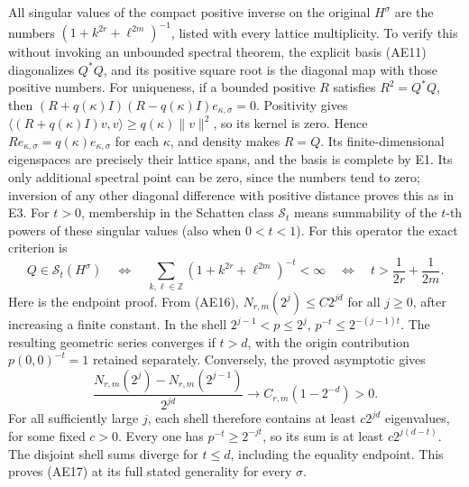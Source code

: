 \documentclass[
  11pt,
]{article}
\begin{document}
All singular values of the compact positive inverse on the original
\(H^\sigma\) are the numbers \((1+k^{2r}+\ell^{2m})^{-1}\), listed with
every lattice multiplicity. To verify this without invoking an unbounded
spectral theorem, the explicit basis (AE11) diagonalizes \(Q^*Q\), and
its positive square root is the diagonal map with those positive
numbers. For uniqueness, if a bounded positive \(R\) satisfies
\(R^2=Q^*Q\), then \((R+q(\kappa)I)(R-q(\kappa)I)e_{\kappa,\sigma}=0\).
Positivity gives \(\langle(R+q(\kappa)I)v,v\rangle
\geq q(\kappa)\|v\|^2\), so its kernel is zero. Hence
\(Re_{\kappa,\sigma}=q(\kappa)e_{\kappa,\sigma}\) for each \(\kappa\),
and density makes \(R=Q\). Its finite-dimensional eigenspaces are
precisely their lattice spans, and the basis is complete by E1. Its only
additional spectral point can be zero, since the numbers tend to zero;
inversion of any other diagonal difference with positive distance proves
this as in E3. For \(t>0\), membership in the Schatten class
\(\mathcal S_t\) means summability of the \(t\)-th powers of these
singular values (also when \(0<t<1\)). For this operator the exact
criterion is \[
 Q\in\mathcal S_t(H^\sigma)
 \quad\Longleftrightarrow\quad
 \sum_{k,\ell\in\mathbb Z}(1+k^{2r}+\ell^{2m})^{-t}<\infty
 \quad\Longleftrightarrow\quad t>\frac1{2r}+\frac1{2m}.
 \tag{AE17}
\] Here is the endpoint proof. From (AE16), \(N_{r,m}(2^j)\leq C2^{jd}\)
for all \(j\geq0\), after increasing a finite constant. In the shell
\(2^{j-1}<p\leq2^j\), \(p^{-t}\leq2^{-(j-1)t}\). The resulting geometric
series converges if \(t>d\), with the origin contribution
\(p(0,0)^{-t}=1\) retained separately. Conversely, the proved asymptotic
gives \[
 \frac{N_{r,m}(2^j)-N_{r,m}(2^{j-1})}{2^{jd}}
       \longrightarrow C_{r,m}(1-2^{-d})>0.
 \tag{AE18}
\] For all sufficiently large \(j\), each shell therefore contains at
least \(c2^{jd}\) eigenvalues, for some fixed \(c>0\). Every one has
\(p^{-t}\geq2^{-jt}\), so its sum is at least \(c2^{j(d-t)}\). The
disjoint shell sums diverge for \(t\leq d\), including the equality
endpoint. This proves (AE17) at its full stated generality for every
\(\sigma\).
\end{document}
